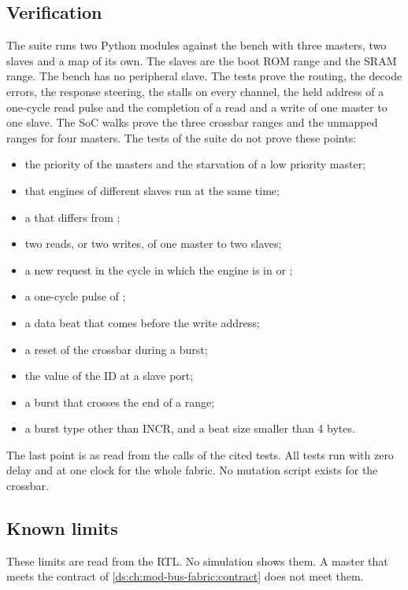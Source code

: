 \subsection{Verification}
The suite  runs two Python modules against the bench  with three masters, two slaves and a map of its own. The slaves are the boot ROM range and the SRAM range. The bench has no peripheral slave. The tests prove the routing, the decode errors, the response steering, the stalls on every channel, the held address of a one-cycle read pulse and the completion of a read and a write of one master to one slave. The SoC walks prove the three crossbar ranges and the unmapped ranges for four masters. The tests of the suite do not prove these points:
\begin{itemize}
  \item the priority of the masters and the starvation of a low priority master;
  \item that engines of different slaves run at the same time;
  \item a  that differs from ;
  \item two reads, or two writes, of one master to two slaves;
  \item a new request in the cycle in which the engine is in  or ;
  \item a one-cycle pulse of ;
  \item a data beat that comes before the write address;
  \item a reset of the crossbar during a burst;
  \item the value of the ID at a slave port;
  \item a burst that crosses the end of a range;
  \item a burst type other than INCR, and a beat size smaller than 4 bytes.
\end{itemize}
The last point is as read from the calls of the cited tests. All tests run with zero delay and at one clock for the whole fabric. No mutation script exists for the crossbar.

\subsection{Known limits}\label{tm:mod:axi4-crossbar:limits}
These limits are read from the RTL. No simulation shows them. A master that meets the contract of \cref{ds:ch:mod-bus-fabric:contract} does not meet them.

